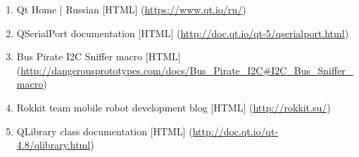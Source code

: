 \begin{enumerate}
 \item \label{qt_home} Qt Home | Russian [HTML] (\url{https://www.qt.io/ru/})
 \item \label{qtserialport} QSerialPort documentation [HTML] (\url{http://doc.qt.io/qt-5/qserialport.html})
 \item \label{buspirate_i2c_snif} Bus Pirate I2C Sniffer macro [HTML] (\url{http://dangerousprototypes.com/docs/Bus_Pirate_I2C#I2C_Bus_Sniffer_macro})
 \item \label{rokkit_bot} Rokkit team mobile robot development blog [HTML] (\url{http://rokkit.su/})
 \item \label{qlibrary} QLibrary class documentation [HTML] (\url{http://doc.qt.io/qt-4.8/qlibrary.html})
\end{enumerate}
